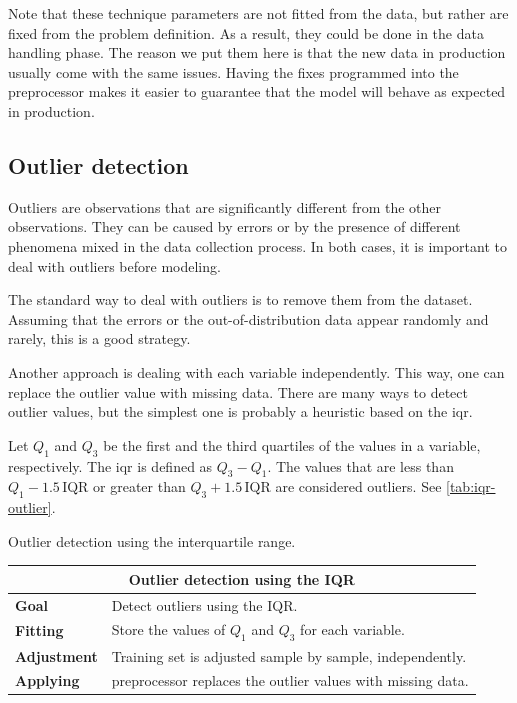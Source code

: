 Note that these technique parameters are not fitted from the data, but rather are fixed
from the problem definition.  As a result, they could be done in the data handling phase.
The reason we put them here is that the new data in production usually come with the
same issues.  Having the fixes programmed into the \gls{preprocessor} makes it easier to
guarantee that the model will behave as expected in production.

\subsection{Outlier detection}

Outliers are observations that are significantly different from the other observations.
They can be caused by errors or by the presence of different phenomena mixed in the data
collection process.  In both cases, it is important to deal with outliers before modeling.

The standard way to deal with outliers is to remove them from the dataset.  Assuming that
the errors or the out-of-distribution data appear randomly and rarely, this is a good
strategy.

Another approach is dealing with each variable independently.  This way, one can replace
the outlier value with missing data.  There are many ways to detect outlier values, but
the simplest one is probably a heuristic based on the \gls{iqr}.

Let $Q_1$ and $Q_3$ be the first and the third quartiles of the values in a variable,
respectively.  The \gls{iqr} is defined as $Q_3 - Q_1$.  The values that are less than
$Q_1 - 1.5\, \text{IQR}$ or greater than $Q_3 + 1.5\, \text{IQR}$ are considered outliers.
See \cref{tab:iqr-outlier}.

\begin{tablebox}[label=tab:iqr-outlier]{Outlier detection using the interquartile range.}
  \centering
  \begin{tabular}{lp{6cm}}
    \toprule
    \multicolumn{2}{c}{\textbf{Outlier detection using the IQR}} \\
    \midrule
    \textbf{Goal} &
      Detect outliers using the IQR. \\
    \textbf{Fitting} &
      Store the values of $Q_1$ and $Q_3$ for each variable. \\
    \textbf{Adjustment} &
      Training set is adjusted sample by sample, independently. \\
    \textbf{Applying} &
      \Gls{preprocessor} replaces the outlier values with missing data. \\
    \bottomrule
  \end{tabular}
\end{tablebox}

